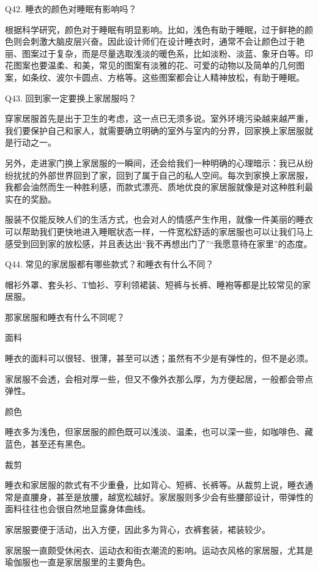 \documentclass[12pt,UTF8]{ctexbook}
\begin{document}
Q42. 睡衣的颜色对睡眠有影响吗？


根据科学研究，颜色对于睡眠有明显影响。比如，浅色有助于睡眠，过于鲜艳的颜色则会刺激大脑皮层兴奋。因此设计师们在设计睡衣时，通常不会让颜色过于艳丽、图案过于复杂，而是尽量选取浅淡的暖色系，比如淡粉、淡蓝、象牙白等。印花图案也要温柔、和美，常见的图案有淡雅的花、可爱的动物以及简单的几何图案，如条纹、波尔卡圆点、方格等。这些图案都会让人精神放松，有助于睡眠。





Q43. 回到家一定要换上家居服吗？


穿家居服首先是出于卫生的考虑，这一点已无须多说。室外环境污染越来越严重，我们要保护自己和家人，就需要确立明确的室外与室内的分界，回家换上家居服就是行动之一。

另外，走进家门换上家居服的一瞬间，还会给我们一种明确的心理暗示：我已从纷纷扰扰的外部世界回到了家，回到了属于自己的私人空间。每次到家换上家居服，我都会油然而生一种胜利感，而款式漂亮、质地优良的家居服就像是对这种胜利最实在的奖励。

服装不仅能反映人们的生活方式，也会对人的情感产生作用，就像一件美丽的睡衣可以帮助我们更快地进入睡眠状态一样，一件宽松舒适的家居服也可以让我们马上感受到回到家的放松感，并且表达出“我不再想出门了”“我愿意待在家里”的态度。





Q44. 常见的家居服都有哪些款式？和睡衣有什么不同？


帽衫外罩、套头衫、T恤衫、亨利领裙装、短裤与长裤、睡袍等都是比较常见的家居服。

那家居服和睡衣有什么不同呢？

面料

睡衣的面料可以很轻、很薄，甚至可以透；虽然有不少是有弹性的，但不是必须。

家居服不会透，会相对厚一些，但又不像外衣那么厚，为方便起居，一般都会带点弹性。

颜色

睡衣多为浅色，但家居服的颜色既可以浅淡、温柔，也可以深一些，如咖啡色、藏蓝色，甚至还有黑色。

裁剪

睡衣和家居服的款式有不少重叠，比如背心、短裤、长裤等。从裁剪上说，睡衣通常是直腰身，甚至是放腰，越宽松越好。家居服则多少会有些腰部设计，带弹性的面料往往也会很自然地显露身体曲线。

家居服要便于活动，出入方便，因此多为背心，衣裤套装，裙装较少。

家居服一直颇受休闲衣、运动衣和街衣潮流的影响。运动衣风格的家居服，尤其是瑜伽服也一直是家居服里的主要角色。
\end{document}
